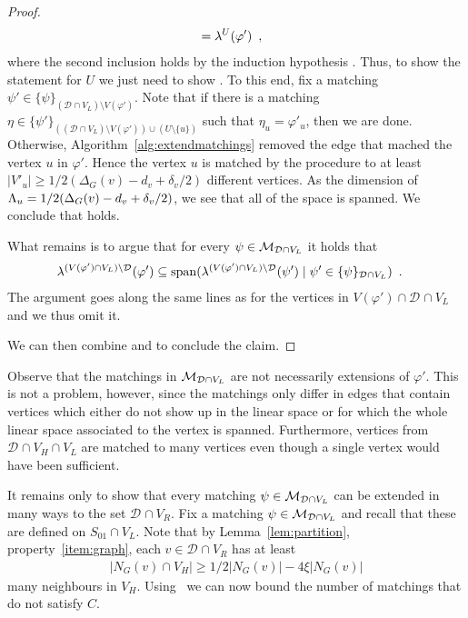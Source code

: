 \documentclass{theoretics}
\newcommand{\set}[1]{\{ #1 \}}
\newcommand{\Setsize}[1]{\bigl\lvert#1\bigr\rvert}
\newcommand{\setsize}[1]{\lvert#1\rvert}
\newcommand{\eqperiod}{\enspace .}
\newcommand{\eqcomma}{\enspace ,}
\newcommand{\neigh}[2][]{N_{{#1}}(#2)}
\renewcommand{\deg}[2][XXXXXXXXXXXX]{\Delta_{#1}(#2)}
\newcommand{\diff}{\xi}
\newcommand{\ontodimLi}{1/2(\deg[G]{v} - d_v + \delta_v/2)}
\newcommand{\V}[1][]{V_{#1}}
\newcommand{\Vl}{\V[L]}
\newcommand{\Vr}{\V[R]}
\newcommand{\Vh}{\V[H]}
\newcommand{\linspace}[1][]{\ensuremath \Lambda_{{#1}}}
\newcommand{\linmapl}[2][]{\ensuremath \lambda^{{#2}}_{{#1}}}
\newcommand{\linmaplof}[3][]{\linmapl[#1]{#2}(#3)}
\newcommand{\diffclosure}[1][]{D_{{#1}}}
\renewcommand{\diffclosure}[1][]{\mathcal{D}_{{#1}}}
\newcommand{\matchb}{\varphi'}
\newcommand{\matchc}{\psi}
\newcommand{\matchd}{\psi'}
\newcommand{\matche}{\eta}
\newcommand{\matchings}[1][]{\ensuremath \mathcal{M}_{{#1}}}
\newcommand{\spans}[1]{\mathrm{span} ( #1 )}
\numberwithin{equation}{section}
\begin{document}
\begin{proof}
\begin{align}
    &= \linmaplof{U}{\matchb} \eqcomma
  \end{align}
  where the second inclusion holds by the induction hypothesis
  . 
  Thus, to show the statement for $U$ we just need to show 
  .
  To this end, fix a matching 
  ${\matchd \in \set{\matchc}_{(\diffclosure \cap \Vl) \setminus V(\matchb)}}$.
  Note that if there is a matching
  $\matche \in \set{\matchd}_{((\diffclosure \cap \Vl) \setminus
    V(\matchb)) \cup (U \setminus \set{u})}$ 
  such that $\matche_u = \matchb_u$, then we are done.
  Otherwise, Algorithm~\ref{alg:extendmatchings} removed the edge
  that mached the vertex $u$ in $\matchb$. Hence the vertex $u$ is
  matched by the procedure to at least $\setsize{V'_{u}} \ge \ontodimLi$
  different vertices. As the dimension of $\linspace[u] = \ontodimLi$,
  we see that all of the space is spanned. We conclude that
   holds.

  What remains is to argue that for every $\matchc \in
  \matchings[\diffclosure \cap \Vl]$ it holds that
  \begin{align}\label{eq:not_d}
    \linmaplof{(V(\matchb) \cap \Vl) \setminus \diffclosure}{\matchb}
    &\subseteq
      \spans{\linmaplof{(V(\matchb) \cap \Vl) \setminus \diffclosure}
      {\matchd} \mid \matchd \in
      \set{\matchc}_{\diffclosure \cap \Vl}} \eqperiod
  \end{align}
  The argument goes along the same lines as for the vertices in 
  $V(\matchb) \cap \diffclosure \cap \Vl$ and we thus omit it.

  We can then combine  and  to conclude
  the claim.
\end{proof}

   
  Observe that the matchings in $\matchings[\diffclosure \cap \Vl]$ are
  not necessarily extensions of $\matchb$. This is not a problem, however,
  since the matchings only
  differ in edges that contain vertices which either do not show up in the linear space or
  for which the whole linear space associated to the vertex is spanned. Furthermore, vertices from $\diffclosure \cap \Vh \cap \Vl$ are matched to
  many vertices
  even though a single vertex would have been sufficient.

  It remains only to show that every matching
  $\matchc \in \matchings[\diffclosure \cap \Vl]$ can be extended in
  many ways to the set $\diffclosure \cap \Vr$.
  Fix a matching 
  $\matchc \in \matchings[\diffclosure \cap \Vl]$ and recall
  that these are defined on $S_{01} \cap \Vl$.
  Note that by Lemma~\ref{lem:partition}, property~\ref{item:graph},
  each $v \in \diffclosure \cap \Vr$ has at least
  \begin{equation}
  \begin{aligned}
  	\Setsize{\neigh[G]{v} \cap \Vh} \ge 
  	1/2 \Setsize{ \neigh[G]{v} } - 4 \diff \Setsize{ \neigh[G]{v} } 
  	\label{eq:largeneighbourhood}
  \end{aligned}
  \end{equation}
  many neighbours in $\Vh$.
  Using~ we can now bound the number of matchings that do not 
  satisfy $C$.
\end{document}
